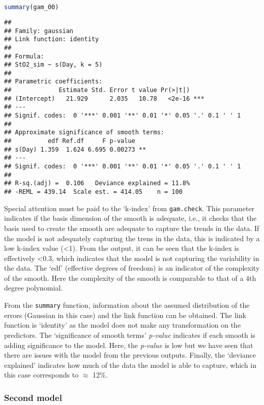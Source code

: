 \documentclass[
]{article}
\newcommand{\passthrough}[1]{#1}
\begin{document}
\begin{lstlisting}[language=R]
summary(gam_00)
\end{lstlisting}

\begin{lstlisting}
## 
## Family: gaussian 
## Link function: identity 
## 
## Formula:
## StO2_sim ~ s(Day, k = 5)
## 
## Parametric coefficients:
##             Estimate Std. Error t value Pr(>|t|)    
## (Intercept)   21.929      2.035   10.78   <2e-16 ***
## ---
## Signif. codes:  0 '***' 0.001 '**' 0.01 '*' 0.05 '.' 0.1 ' ' 1
## 
## Approximate significance of smooth terms:
##          edf Ref.df     F p-value   
## s(Day) 1.359  1.624 6.695 0.00273 **
## ---
## Signif. codes:  0 '***' 0.001 '**' 0.01 '*' 0.05 '.' 0.1 ' ' 1
## 
## R-sq.(adj) =  0.106   Deviance explained = 11.8%
## -REML = 439.14  Scale est. = 414.05    n = 100
\end{lstlisting}

Special attention must be paid to the `k-index' from \passthrough{\lstinline!gam.check!}. This parameter indicates if the basis dimension of the smooth is adequate, i.e., it checks that the basis used to create the smooth are adequate to capture the trends in the data. If the model is not adequately capturing the trens in the data, this is indicated by a low k-index value (\textless1). From the output, it can be seen that the k-index is effectively \textless0.3, which indicates that the model is not capturing the variability in the data. The `edf' (effective degrees of freedom) is an indicator of the complexity of the smooth. Here the complexity of the smooth is comparable to that of a 4th degree polynomial.

From the \passthrough{\lstinline!summary!} function, information about the assumed distribution of the errors (Gaussian in this case) and the link function can be obtained. The link function is `identity' as the model does not make any transformation on the predictors. The `significance of smooth terms' \emph{p-value} indicates if each smooth is adding significance to the model. Here, the \emph{p-value} is low but we have seen that there are issues with the model from the previous outputs. Finally, the `deviance explained' indicates how much of the data the model is able to capture, which in this case corresponds to \(\approx\) 12\%.

\hypertarget{second-model}{%
\subsubsection{Second model}\label{second-model}}
\end{document}
